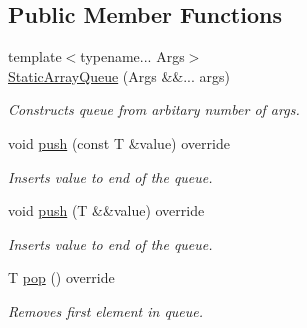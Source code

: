 \subsection*{Public Member Functions}
\begin{DoxyCompactItemize}
\item 
{\footnotesize template$<$typename... Args$>$ }\\\hyperlink{classlab_1_1impl_1_1StaticArrayQueue_a8c77c1506a3fdc3c4b0ccd41aa7352ff}{Static\+Array\+Queue} (Args \&\&... args)
\begin{DoxyCompactList}\small\item\em Constructs queue from arbitary number of args. \end{DoxyCompactList}\item 
\mbox{\label{classlab_1_1impl_1_1StaticArrayQueue_a73094b978df25af0453d5e9787d81957}} 
void \hyperlink{classlab_1_1impl_1_1StaticArrayQueue_a73094b978df25af0453d5e9787d81957}{push} (const T \&value) override
\begin{DoxyCompactList}\small\item\em Inserts value to end of the queue. \end{DoxyCompactList}\item 
\mbox{\label{classlab_1_1impl_1_1StaticArrayQueue_a55460501294a71b11e94c44bfcdb18d3}} 
void \hyperlink{classlab_1_1impl_1_1StaticArrayQueue_a55460501294a71b11e94c44bfcdb18d3}{push} (T \&\&value) override
\begin{DoxyCompactList}\small\item\em Inserts value to end of the queue. \end{DoxyCompactList}\item 
\mbox{\label{classlab_1_1impl_1_1StaticArrayQueue_ad246e9b69d05aa6705b796a27082a1a4}} 
T \hyperlink{classlab_1_1impl_1_1StaticArrayQueue_ad246e9b69d05aa6705b796a27082a1a4}{pop} () override
\begin{DoxyCompactList}\small\item\em Removes first element in queue. \end{DoxyCompactList}\item 
\mbox{\label{classlab_1_1impl_1_1StaticArrayQueue_adbf6d2a433d6dcf637fadfd555df4dbd}} 

\end{DoxyCompactItemize}
